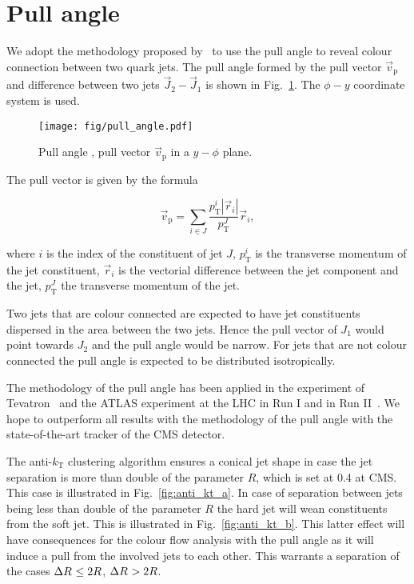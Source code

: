 \section{Pull angle}

We adopt the methodology proposed by~\cite{Gallicchio:2010sw} to use the pull angle to reveal colour connection between two quark jets. The pull angle \pullangle formed by the pull vector $\vec{v}_{\text{p}}$ and difference between two jets $\vec{J}_{2}-\vec{J}_{1}$ is shown in Fig.~\ref{fig:pull_angle}. The $\phi-y$ coordinate system is used. 

\begin{figure}[hbtp]
  \centering
  \texttt{[image: fig/pull\_angle.pdf]}
  \caption{Pull angle \pullangle, pull vector $\vec{v}_{\text{p}}$ in a $y-\phi$ plane.}
  \label{fig:pull_angle}
\end{figure}

The pull vector is given by the formula

\begin{equation}
  \vec{v}_{\text{p}}=\sum_{i\in J}\frac{p^{i}_{\text{T}}|\vec{r}_{i}|}{p^{J}_{\text{T}}}\vec{r}_{i},
  \label{Eq:pull_angle}
\end{equation}

\noindent where $i$ is the index of the constituent of jet $J$, $p^{i}_{\text{T}}$ is the transverse momentum of the jet constituent, $\vec{r}_{i}$ is the vectorial difference between the jet component and the jet, $p^{J}_{\text{T}}$ \textendash the transverse momentum of the jet.

Two jets that are colour connected are expected to have jet constituents dispersed in the area between the two jets. Hence the pull vector of $J_{1}$ would point towards $J_{2}$ and the pull angle would be narrow. For jets that are not colour connected the pull angle is expected to be distributed isotropically.

The methodology of the pull angle has been applied in the \DZERO experiment of Tevatron~\cite{Abazov:2011vh} and the ATLAS experiment at the LHC in Run I \cite{Aad:2015lxa} and in Run II~\cite{ATLAS:2017iaz}. We hope to outperform all results with the methodology of the pull angle with the state-of-the-art tracker of the CMS detector.

The anti-$k_{\text{T}}$ clustering algorithm ensures a conical jet shape in case the jet separation \DeltaR is more than double of the parameter $R$, which is set at 0.4 at CMS. This case is illustrated in Fig.~\ref{fig:anti_kt_a}. In case of separation between jets \DeltaR being less than double of the parameter $R$ the hard jet will wean constituents from the soft jet. This is illustrated in Fig.~\ref{fig:anti_kt_b}. This latter effect will have consequences for the colour flow analysis with the pull angle as it will induce a pull from the involved jets to each other. This warrants a separation of the cases $\Delta R^{}\leq2R$, $\Delta R^{}>2R$. 

